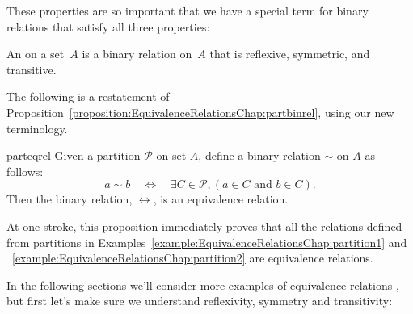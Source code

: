 These properties  are so important that we have a special term for binary relations that satisfy all three properties:

\begin{defn}\label{defn:equivalencerelation}
An  on a set~$A$ is a binary relation on~$A$ that is reflexive, symmetric, and transitive.
\end{defn}

The following is a restatement of Proposition~\ref{proposition:EquivalenceRelationsChap:partbinrel}, using our new terminology.

\begin{prop}{parteqrel} Given a partition $\mathcal{P}$ on set $A$, define a binary relation $\sim$ on $A$ as follows: 
\[a \sim b \quad \iff \quad \exists C \in \mathcal{P}, ( a \in C \text{ and } b \in C ).\]  
Then the binary relation, $\rel$, is an equivalence relation.
\end{prop}

At one stroke, this proposition immediately proves that all  the relations defined from partitions in Examples~\ref{example:EquivalenceRelationsChap:partition1} and ~\ref{example:EquivalenceRelationsChap:partition2} are equivalence relations.

In the following sections we'll consider more examples of equivalence relations , but first let's make sure we understand reflexivity, symmetry and transitivity:

